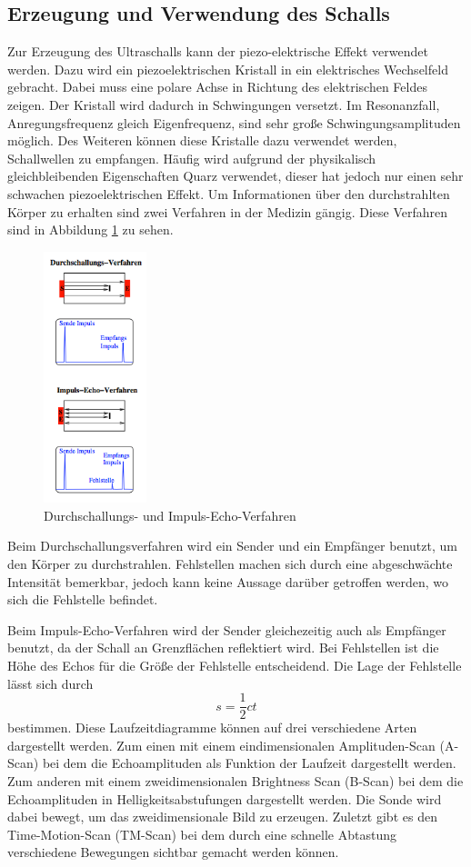 \subsection{Erzeugung und Verwendung des Schalls}
Zur Erzeugung des Ultraschalls kann der piezo-elektrische Effekt verwendet werden.
Dazu wird ein  piezoelektrischen Kristall in ein elektrisches Wechselfeld gebracht.
Dabei muss eine polare Achse in Richtung des elektrischen Feldes zeigen. Der Kristall
wird dadurch in Schwingungen versetzt. Im Resonanzfall, Anregungsfrequenz gleich
Eigenfrequenz, sind sehr große Schwingungsamplituden möglich.
Des Weiteren können diese Kristalle dazu verwendet werden, Schallwellen zu
empfangen. Häufig wird aufgrund der physikalisch gleichbleibenden Eigenschaften
Quarz verwendet, dieser hat jedoch nur einen sehr schwachen piezoelektrischen
Effekt.
Um Informationen über den durchstrahlten Körper zu erhalten sind zwei Verfahren in
der Medizin gängig. Diese Verfahren sind in Abbildung \ref{fig:verfahren} zu sehen.
\begin{figure}
  \centering
  \includegraphics[width=3cm]{bilder/verfahren.png}
  \caption{Durchschallungs- und Impuls-Echo-Verfahren \cite{us2}}
  \label{fig:verfahren}
\end{figure}
Beim Durchschallungsverfahren wird ein Sender und ein Empfänger benutzt, um den
Körper zu durchstrahlen. Fehlstellen machen sich durch eine abgeschwächte
Intensität bemerkbar, jedoch kann keine Aussage darüber getroffen werden, wo
sich die Fehlstelle befindet.

\noindent Beim Impuls-Echo-Verfahren wird der Sender gleichezeitig auch als Empfänger benutzt,
da der Schall an Grenzflächen reflektiert wird. Bei Fehlstellen ist die Höhe des
Echos für die Größe der Fehlstelle entscheidend. Die Lage der Fehlstelle lässt sich
durch
\begin{equation}
  s = \frac{1}{2} c t
\end{equation}
bestimmen. Diese Laufzeitdiagramme können auf drei verschiedene Arten dargestellt werden.
Zum einen mit einem eindimensionalen Amplituden-Scan (A-Scan) bei dem die Echoamplituden als Funktion
der Laufzeit dargestellt werden. Zum anderen mit einem zweidimensionalen Brightness
Scan (B-Scan) bei dem die Echoamplituden in Helligkeitsabstufungen dargestellt werden.
Die Sonde wird dabei bewegt, um das zweidimensionale Bild zu erzeugen.
Zuletzt gibt es den Time-Motion-Scan (TM-Scan) bei dem durch eine schnelle Abtastung
verschiedene Bewegungen sichtbar gemacht werden können.
